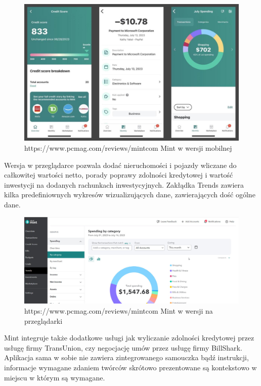 \documentclass[a4paper,10pt, twoside]{report}
\begin{document}
\begin{large}
\begin{figure}[H]           %
    \centering  
    \includegraphics[width=12cm]{figures/pcmag_mintmobile_05OMSsUmroXJ6F6sETKpH9R-50.fit_lim.size_1152x.jpg}
    \caption{https://www.pcmag.com/reviews/mintcom Mint w wersji mobilnej}
    \label{mintmobile}
\end{figure}

{Wersja w przeglądarce pozwala dodać nieruchomości i pojazdy wliczane do 
całkowitej wartości netto, porady poprawy zdolności kredytowej i wartość 
inwestycji na dodanych rachunkach inwestycyjnych. Zakłądka Trends zawiera 
kilka predefiniownych wykresów wizualizujących dane, zawierających dość ogólne 
dane.}

\begin{figure}[H]           %
    \centering  
    \includegraphics[width=12cm]{figures/pcmag_mintweb_05OMSsUmroXJ6F6sETKpH9R-51.fit_lim.size_1152x.jpg}
    \caption{https://www.pcmag.com/reviews/mintcom Mint w wersji na przeglądarki}
    \label{fig:mintweb}
\end{figure}

{Mint integruje także dodatkowe usługi jak wyliczanie zdolności kredytowej przez 
usługę firmy TransUnion, czy negocjację umów przez usługę firmy BillShark. 
Aplikacja sama w sobie nie zawiera zintegrowanego samouczka bądź instrukcji, 
informacje wymagane zdaniem twórców skrótowo prezentowane są kontekstowo w miejscu w 
którym są wymagane.}


\end{large}
\end{document}
